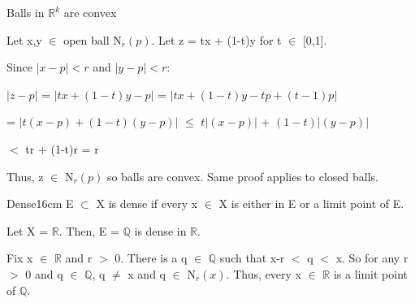 	\begin{example}
		Balls in $\mathbb{R}^k$ are convex
	\end{example}

	\begin{tbox}
		Let x,y $\in$ open ball N$_r(p)$. Let z = tx + (1-t)y for t $\in$ [0,1].
		
		Since $|x - p| < r$ and $|y - p| < r$:

		\hspace{1cm}
		$|z - p|$ = $|tx + (1-t)y - p|$
		= $|tx + (1-t)y - tp + (t-1)p|$

		\hspace{2.3cm}
		= $|t(x-p) + (1-t)(y-p)|$ $\leq$ $t|(x-p)|$ + $(1-t)|(y-p)|$

		\hspace{2.3cm}
		$<$ tr + (1-t)r = r

		Thus, z $\in$ N$_r(p)$ so balls are convex.
		Same proof applies to closed balls.	
	\end{tbox}

	\vspace{0.5cm}



	\begin{definition}{Dense}{16cm}
		E $\subset$ X is {\color{lblue} dense} if every x $\in$ X is either in E or
		a limit point of E.
	\end{definition}
	
	\vspace{0.5cm}



	\begin{example}
		Let X = $\mathbb{R}$. Then, E = $\mathbb{Q}$ is dense in $\mathbb{R}$.
	\end{example}

	\begin{tbox}
		Fix x $\in$ $\mathbb{R}$ and r $>$ 0.
		There is a q $\in$ $\mathbb{Q}$ such that x-r $<$ q $<$ x.
		So for any r $>$ 0 and q $\in$ $\mathbb{Q}$, q $\neq$ x and
		q $\in$ N$_r(x)$.
		Thus, every x $\in$ $\mathbb{R}$ is a limit point of $\mathbb{Q}$.
	\end{tbox}
	 




